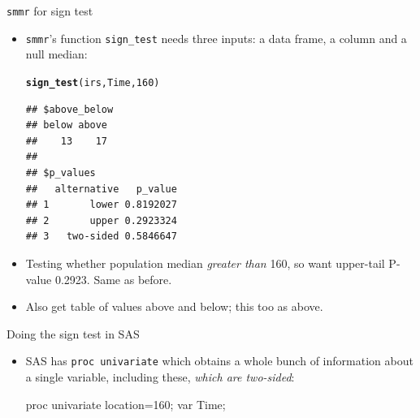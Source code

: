 \documentclass[unknownkeysallowed]{beamer}\usepackage[]{graphicx}\usepackage[]{color}
\makeatletter
\newcommand{\hlnum}[1]{\textcolor[rgb]{0.686,0.059,0.569}{#1}}%
\newcommand{\hlstd}[1]{\textcolor[rgb]{0.345,0.345,0.345}{#1}}%
\newcommand{\hlkwd}[1]{\textcolor[rgb]{0.737,0.353,0.396}{\textbf{#1}}}%
\newenvironment{kframe}{%
 \def\at@end@of@kframe{}%
 \ifinner\ifhmode%
  \def\at@end@of@kframe{\end{minipage}}%
  \begin{minipage}{\columnwidth}%
 \fi\fi%
 \def\FrameCommand##1{\hskip\@totalleftmargin \hskip-\fboxsep
 \colorbox{shadecolor}{##1}\hskip-\fboxsep
     \hskip-\linewidth \hskip-\@totalleftmargin \hskip\columnwidth}%
 \MakeFramed {\advance\hsize-\width
   \@totalleftmargin\z@ \linewidth\hsize
   \@setminipage}}%
 {\par\unskip\endMakeFramed%
 \at@end@of@kframe}
\newenvironment{knitrout}{}{} %
\makeatother
\begin{document}
\begin{frame}[fragile]{\texttt{smmr} for sign test}
  
  \begin{itemize}
  \item \texttt{smmr}'s function \texttt{sign\_test} needs three
    inputs: a data frame, a column and a null median:
    
\begin{knitrout}
\color{fgcolor}\begin{kframe}
\begin{alltt}
\hlkwd{sign_test}\hlstd{(irs,Time,}\hlnum{160}\hlstd{)}
\end{alltt}
\begin{verbatim}
## $above_below
## below above 
##    13    17 
## 
## $p_values
##   alternative   p_value
## 1       lower 0.8192027
## 2       upper 0.2923324
## 3   two-sided 0.5846647
\end{verbatim}
\end{kframe}
\end{knitrout}

\item Testing whether population median \emph{greater than} 160, so
  want upper-tail P-value 0.2923. Same as before.
\item Also get table of values above and below; this too as above.
  \end{itemize}
  
\end{frame}

\begin{frame}[fragile]{Doing the sign test in SAS}
  
  \begin{itemize}
  \item SAS has \texttt{proc univariate} which obtains a whole bunch
    of information about a single variable, including these,
    \emph{which are two-sided}:
    
    \begin{Sascode}[store=im]
proc univariate location=160;
  var Time;
    \end{Sascode}
    
  \end{itemize}
  
\end{frame}
\end{document}

